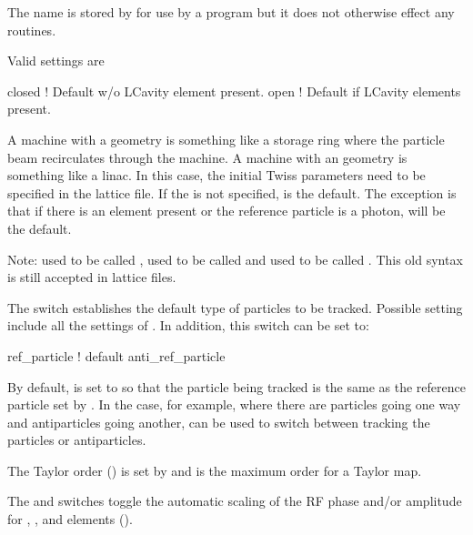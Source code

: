 The  name is stored by \bmad for use by a program but it does
not otherwise effect any \bmad routines. 

\noindent
{}
Valid  settings are
\begin{example}
  closed  ! Default w/o LCavity element present.
  open    ! Default if LCavity elements present.
\end{example}
A machine with a  geometry is something like a storage ring
where the particle beam recirculates through the machine.  A machine
with an  geometry is something like a linac.  In this case,
the initial Twiss parameters need to be specified in the lattice
file. If the  is not specified,  is the
default. The exception is that if there is an  element
present or the reference particle is a photon,  will be the
default.

Note:  used to be called , 
used to be called  and  used to be
called . This old syntax is still accepted in
lattice files.

The  switch establishes the
default type of particles to be tracked. Possible setting include
all the settings of . In addition, 
this switch can be set to:
\begin{example}
  ref_particle     ! default
  anti_ref_particle
\end{example}
By default,  is set to 
so that the particle being tracked is the same as the reference
particle set by . In the case, for example,
where there are particles going one way and antiparticles going another,
 can be used to switch between
tracking the particles or antiparticles.


The Taylor order () is set by
 and is the maximum order for a Taylor map.

The  and  switches
toggle the automatic scaling of the RF phase and/or amplitude for
, , and  elements
().

